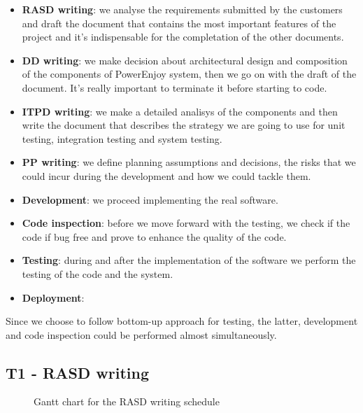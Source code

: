 \documentclass[english]{article}
\begin{document}
\begin{itemize}
	\item{\textbf{RASD writing}: we analyse the requirements submitted by the customers and draft the document that contains the most important features of the project and it's indispensable for the completation of the other documents.}
	
	\item{\textbf{DD writing}: we make decision about architectural design and composition of the components of PowerEnjoy system, then we go on with the draft of the document. It's really important to terminate it before starting to code.}

	\item{\textbf{ITPD writing}: we make a detailed analisys of the components and then write the document that describes the strategy we are going to use for unit testing, integration testing and system testing.}

	\item{\textbf{PP writing}: we define planning assumptions and decisions, the risks that we could incur during the development and how we could tackle them.}

	\item{\textbf{Development}: we proceed implementing the real software.}

	\item{\textbf{Code inspection}: before we move forward with the testing, we check if the code if bug free and prove to enhance the quality of the code.}

	\item{\textbf{Testing}: during and after the implementation of the software we perform the testing of the code and the system.}

	\item{\textbf{Deployment}: }
\end{itemize}

Since we choose to follow bottom-up approach for testing, the latter, development and code inspection could be performed almost simultaneously.

\subsection{T1 - RASD writing}

\begin{figure}[H]
	\centering
	\caption{Gantt chart for the RASD writing schedule}
\end{figure}
\end{document}
